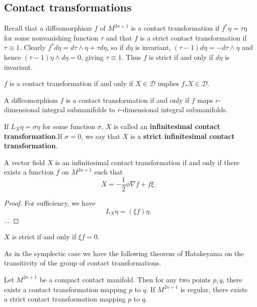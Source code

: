 \subsection{Contact transformations}
Recall that a diffeomorphism $f$ of $M^{2 n+1}$ is a contact transformation if $f^* \eta=\tau \eta$ for some nonvanishing function $\tau$ and that $f$ is a strict contact transformation if $\tau \equiv 1$. Clearly $f^* d \eta=d \tau \wedge \eta+\tau d \eta$, so if $d \eta$ is invariant, $(\tau-1) d \eta=-d \tau \wedge \eta$ and hence $(\tau-1) \eta \wedge d \eta=0$, giving $\tau \equiv 1$. Thus $f$ is strict if and only if $d \eta$ is invariant.

\begin{theorem}
    $f$ is a contact transformation if and only if $X \in \mathcal{D}$ implies $f_* X \in \mathcal{D}$.
\end{theorem}

\begin{theorem}
    A diffeomorphism $f$ is a contact transformation if and only if $f$ maps $r$-dimensional integral submanifolds to $r$-dimensional integral submanifolds.
\end{theorem}

\begin{definition}
    If $L_{X}\eta=\sigma \eta$ for some function $\sigma$, $X$ is called an \textbf{infinitesimal contact transformation}.If $\sigma=0$,  we say that $X$ is a \textbf{strict infinitesimal contact transformation}.
\end{definition}

\begin{theorem}
    A vector field $X$ is an infinitesimal contact transformation if and only if there exists a function $f$ on $M^{2n+1}$ such that 
    \begin{equation}
        X = -\frac{1}{2} \phi \nabla f + f\xi.
    \end{equation}
\end{theorem}
\begin{proof}
    For sufficiency, we have 
    \begin{equation}
        L_{X}\eta=(\xi f) \eta.
    \end{equation}
    ...
\end{proof}

\begin{corollary}
    $X$ is strict if and only if $\xi f=0.$
\end{corollary}

As in the symplectic case we have the following theorem of Hatakeyama on the transitivity of the group of contact transformations.
\begin{theorem}[Hatakeyama, 1966]
    Let $ M^{2n+1}$ be a compact contact manifold. Then for any two points $p, q$, there exists a contact transformation mapping $p$ to $q$. If $M^{2n+1}$ is regular, there exists a strict contact transformation mapping $p$ to $q$.
\end{theorem}


